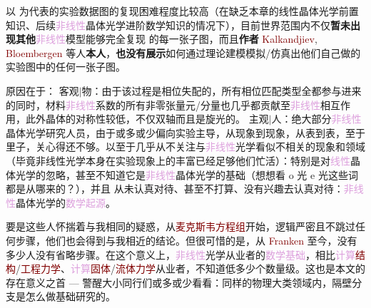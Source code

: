 以  为代表的实验数据图的复现困难程度比较高（在缺乏本章的线性\textcolor{PineGreen}{晶体光学}前置知识、后续\textcolor{Plum}{非线性}\textcolor{PineGreen}{晶体光学}进阶数学知识的情况下），目前世界范围内不仅\textbf{暂未出现其他}\textcolor{Plum}{非线性}模型能够完全复现  的每一张子图，而且\textbf{作者} \textcolor{Maroon}{Kalkandjiev}, \textcolor{Maroon}{Bloembergen} 等人\textbf{本人}，\textbf{也没有展示}如何通过\textcolor{NavyBlue}{理论建模}模拟/仿真出他们自己做的实验图中的任何一张子图\cite{zolotovskayaSecondharmonicConicalRefraction2011,kroupaSecondharmonicConicalRefraction2010,alekseevaShadowConicalRefraction1999,shihConicalRefractionSecondHarmonic1969,schellLaserStudiesInternal1978,velichkinaDemonstrationPhenomenaConical1980,stroganovConicalRefractionSecond1980,illarionovExperimentalObservationConical1979,féveExperimentalStudyInternal1994,grantFrequencydoubledConicallyrefractedGaussian2014,maSumfrequencyGenerationFemtosecond2018,peetFrequencyDoublingLaser2011}。

原因在于：{\one} 客观$\Big|$物：由于该过程是\textcolor{PineGreen}{相位失配}的，所有\textcolor{PineGreen}{相位匹配类型}全都参与进来的同时，材料\textcolor{Plum}{非线性}系数的所有非零张量元/分量也几乎都贡献至\textcolor{Plum}{非线性}相互作用\cite{kroupaSecondharmonicConicalRefraction2010}，此外晶体的对称性较低，不仅双轴而且是旋光的\cite{zolotovskayaSecondharmonicConicalRefraction2011}。{\two} 主观$\Big|$人：绝大部分\textcolor{Plum}{非线性}\textcolor{PineGreen}{晶体光学}研究人员，由于或多或少偏向实验主导，从现象到现象，从表到表，至于里子，关心得还不够。以至于几乎从不关注与\textcolor{Plum}{非线性}光学看似不相关的现象和领域（毕竟{非线性}光学本身在实验现象上的丰富已经足够他们忙活）：特别是对\textcolor{Plum}{线性}\textcolor{PineGreen}{晶体光学}的忽略，甚至不知道它是\textcolor{Plum}{非线性}\textcolor{PineGreen}{晶体光学}的基础（想想看 \textcolor{PineGreen}{o} 光 \textcolor{PineGreen}{e} 光这些词都是从哪来的？），并且 {\three} 从未认真对待、甚至不打算、没有兴趣去认真对待：\textcolor{Plum}{非线性}\textcolor{PineGreen}{晶体光学}的\textcolor{Plum}{数学起源}。

要是这些人怀揣着与我相同的疑惑，从\textcolor{Maroon}{麦克斯韦方程组}开始，逻辑严密且不跳过任何步骤，他们也会得到与我相近的结论。但很可惜的是，从 \textcolor{Maroon}{Franken} 至今，没有多少人没有省略步骤。在这个意义上，\textcolor{Plum}{非线性}光学从业者的\textcolor{Plum}{数学基础}，相比\textcolor{Plum}{计算}\textcolor{Maroon}{结构}/\textcolor{Maroon}{工程力学}\cite{ZhongWanXieZuiYouKongZhiYuJiSuanJieGouLiXueDeMoNiLiLun1993,chandrupatlaIntroductionFiniteElements2011}、\textcolor{Plum}{计算}\textcolor{Maroon}{固体}/\textcolor{Maroon}{流体力学}\cite{kirillovInstabilitiesViscothermodiffusiveSwirling2025,kirillovGeometricalOpticsStability2025}从业者，不知道低多少个数量级。这也是本文的存在意义之首 --- 警醒大小同行们或多或少看看：同样的物理大类领域内，隔壁分支是怎么做基础研究的。

